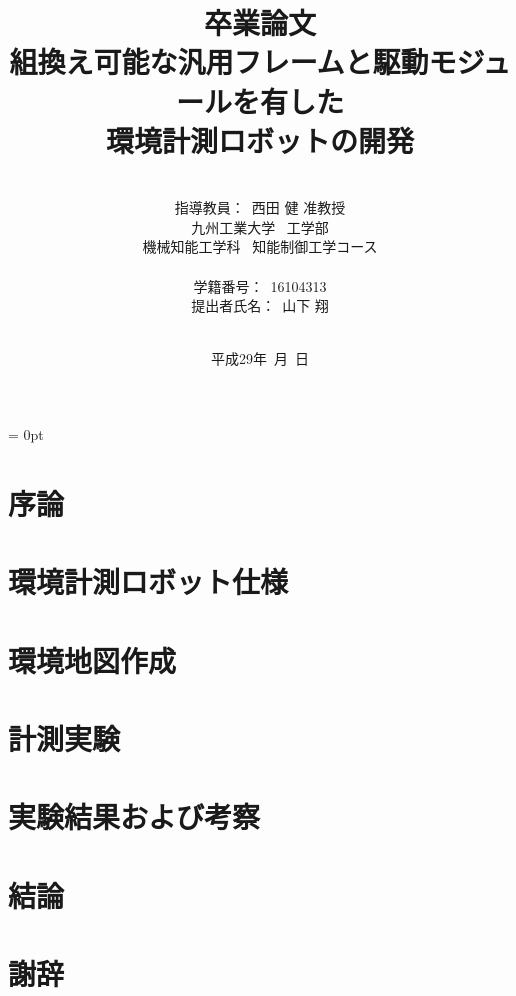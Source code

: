\documentclass[a4paper,12pt]{jarticle}
\title{卒業論文\\
組換え可能な汎用フレームと駆動モジュールを有した\\環境計測ロボットの開発\\
}
\author{\vspace{20mm}\\
指導教員：\ 西田 \hspace{0mm} 健 准教授\\
九州工業大学\ \hspace{0mm} 工学部\\
機械知能工学科\ \hspace{0mm} 知能制御工学コース \\
\vspace{0mm}\\
学籍番号：\ 16104313\\
提出者氏名：\ 山下 \hspace{0mm} 翔\\\vspace{5mm}\\ }
\date{平成29年\ 月\ 日}
\begin{document}
\titlepage
\maketitle
\thispagestyle{empty} \newpage
{}
\setcounter{page}{1}
\parindent = 0pt %

\begin{abstract}

\end{abstract}
\thispagestyle{empty}
\newpage
\thispagestyle{empty}
\tableofcontents
\newpage
\section{序論} \label{intro}

\newpage
\section{環境計測ロボット仕様} \label{spec}

\newpage
\section{環境地図作成} \label{mapping}

\newpage
\section{計測実験} \label{experiment}


\newpage
\section{実験結果および考察} \label{result}

\newpage
\section{結論} \label{conclusion}

\section*{謝辞} \label{thanks}
\end{document}
